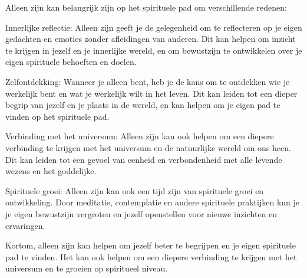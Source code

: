 Alleen zijn kan belangrijk zijn op het spirituele pad om verschillende redenen:

Innerlijke reflectie: Alleen zijn geeft je de gelegenheid om te reflecteren op je eigen gedachten en emoties zonder afleidingen van anderen. Dit kan helpen om inzicht te krijgen in jezelf en je innerlijke wereld, en om bewustzijn te ontwikkelen over je eigen spirituele behoeften en doelen.

Zelfontdekking: Wanneer je alleen bent, heb je de kans om te ontdekken wie je werkelijk bent en wat je werkelijk wilt in het leven. Dit kan leiden tot een dieper begrip van jezelf en je plaats in de wereld, en kan helpen om je eigen pad te vinden op het spirituele pad.

Verbinding met het universum: Alleen zijn kan ook helpen om een diepere verbinding te krijgen met het universum en de natuurlijke wereld om ons heen. Dit kan leiden tot een gevoel van eenheid en verbondenheid met alle levende wezens en het goddelijke.

Spirituele groei: Alleen zijn kan ook een tijd zijn van spirituele groei en ontwikkeling. Door meditatie, contemplatie en andere spirituele praktijken kun je je eigen bewustzijn vergroten en jezelf openstellen voor nieuwe inzichten en ervaringen.

Kortom, alleen zijn kan helpen om jezelf beter te begrijpen en je eigen spirituele pad te vinden. Het kan ook helpen om een diepere verbinding te krijgen met het universum en te groeien op spiritueel niveau.
